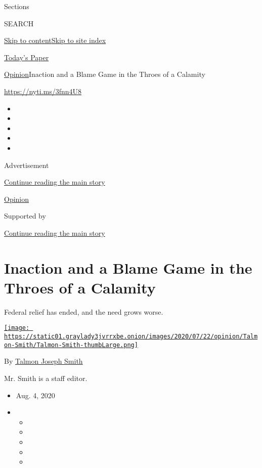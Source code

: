 Sections

SEARCH

\protect\hyperlink{site-content}{Skip to
content}\protect\hyperlink{site-index}{Skip to site index}

\href{https://myaccount.nytimes3xbfgragh.onion/auth/login?response_type=cookie\&client_id=vi}{}

\href{https://www.nytimes3xbfgragh.onion/section/todayspaper}{Today's
Paper}

\href{/section/opinion}{Opinion}\textbar{}Inaction and a Blame Game in
the Throes of a Calamity

\url{https://nyti.ms/3fnn4U8}

\begin{itemize}
\item
\item
\item
\item
\item
\end{itemize}

Advertisement

\protect\hyperlink{after-top}{Continue reading the main story}

\href{/section/opinion}{Opinion}

Supported by

\protect\hyperlink{after-sponsor}{Continue reading the main story}

\hypertarget{inaction-and-a-blame-game-in-the-throes-of-a-calamity}{%
\section{Inaction and a Blame Game in the Throes of a
Calamity}\label{inaction-and-a-blame-game-in-the-throes-of-a-calamity}}

Federal relief has ended, and the need grows worse.

\href{https://www.nytimes3xbfgragh.onion/by/talmon-joseph-smith}{\texttt{[image: https://static01.graylady3jvrrxbe.onion/images/2020/07/22/opinion/Talmon-Smith/Talmon-Smith-thumbLarge.png]}}

By
\href{https://www.nytimes3xbfgragh.onion/by/talmon-joseph-smith}{Talmon
Joseph Smith}

Mr. Smith is a staff editor.

\begin{itemize}
\item
  Aug. 4, 2020
\item
  \begin{itemize}
  \item
  \item
  \item
  \item
  \item
  \end{itemize}
\end{itemize}

